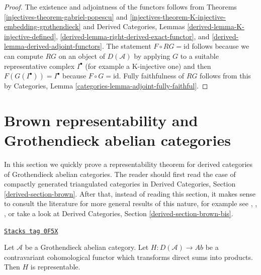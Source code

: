 \begin{proof}

The existence and adjointness of the functors follows from
Theorems \ref{injectives-theorem-gabriel-popescu} and
\ref{injectives-theorem-K-injective-embedding-grothendieck}
and
Derived Categories, Lemmas \ref{derived-lemma-K-injective-defined},
\ref{derived-lemma-right-derived-exact-functor}, and
\ref{derived-lemma-derived-adjoint-functors}.
The statement $F \circ RG = \text{id}$ follows because we can
compute $RG$ on an object of $D(\mathcal{A})$ by applying $G$
to a suitable representative complex $I^\bullet$ (for example
a K-injective one) and then $F(G(I^\bullet)) = I^\bullet$
because $F \circ G = \text{id}$. Fully faithfulness of $RG$
follows from this by
Categories, Lemma \ref{categories-lemma-adjoint-fully-faithful}.
\end{proof}

\section{Brown representability and Grothendieck abelian categories}
\label{injectives-section-brown}
In this section we quickly prove a representability theorem for
derived categories of Grothendieck abelian categories. The reader should
first read the case of compactly generated triangulated categories in
Derived Categories, Section \ref{derived-section-brown}.
After that, instead of reading this section,
it makes sense to consult the literature for more
general results of this nature, for example see
\cite{Franke}, \cite{Neeman}, \cite{Krause}, or take
a look at Derived Categories, Section \ref{derived-section-brown-bis}.

\begin{lemma}[Brown]
\label{injectives-lemma-brown}
\href{https://stacks.math.columbia.edu/tag/0F5X}{\texttt{Stacks tag 0F5X}}

Let $\mathcal{A}$ be a Grothendieck abelian category.
Let $H : D(\mathcal{A}) \to \textit{Ab}$ be a contravariant
cohomological functor which transforms direct sums into products.
Then $H$ is representable.
\end{lemma}

